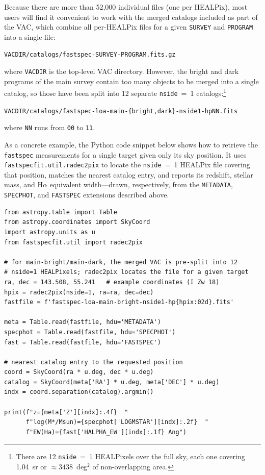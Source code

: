 \documentclass[modern,linenumbers]{aastex702}
\newcommand{\fastspec}{\texttt{fastspec}}
\newcommand{\ha}{\ensuremath{\mathrm{H}\alpha}}
\begin{document}
Because there are more than 52,000 individual files (one per HEALPix),
most users will find it convenient to work with the merged catalogs
included as part of the VAC, which combine all per-HEALPix files for a
given \texttt{SURVEY} and \texttt{PROGRAM} into a single file:

\medskip
\noindent\texttt{VACDIR/catalogs/fastspec-SURVEY-PROGRAM.fits.gz}
\medskip

\noindent where \texttt{VACDIR} is the top-level VAC
directory. However, the bright and dark programs of the main survey
contain too many objects to be merged into a single catalog, so those
have been split into 12 separate \texttt{nside}~=~1
catalogs:\footnote{There are 12 \texttt{nside}~=~1 HEALPixels over the
full sky, each one covering 1.04~sr or $\approx3438$~deg$^{2}$ of
non-overlapping area.}

\medskip
\noindent\texttt{VACDIR/catalogs/fastspec-loa-main-\{bright,dark\}-nside1-hpNN.fits}
\medskip

\noindent where \texttt{NN} runs from \texttt{00} to \texttt{11}.

As a concrete example, the Python code snippet below shows how to
retrieve the \fastspec{} measurements for a single target given only
its sky position. It uses \texttt{fastspecfit.util.radec2pix} to
locate the \texttt{nside}~=~1 HEALPix file covering that position,
matches the nearest catalog entry, and reports its redshift, stellar
mass, and \ha{} equivalent width---drawn, respectively, from the
\texttt{METADATA}, \texttt{SPECPHOT}, and \texttt{FASTSPEC} extensions
described above.

\begin{verbatim}
from astropy.table import Table
from astropy.coordinates import SkyCoord
import astropy.units as u
from fastspecfit.util import radec2pix

# for main-bright/main-dark, the merged VAC is pre-split into 12
# nside=1 HEALPixels; radec2pix locates the file for a given target
ra, dec = 143.508, 55.241   # example coordinates (I Zw 18)
hpix = radec2pix(nside=1, ra=ra, dec=dec)
fastfile = f'fastspec-loa-main-bright-nside1-hp{hpix:02d}.fits'

meta = Table.read(fastfile, hdu='METADATA')
specphot = Table.read(fastfile, hdu='SPECPHOT')
fast = Table.read(fastfile, hdu='FASTSPEC')

# nearest catalog entry to the requested position
coord = SkyCoord(ra * u.deg, dec * u.deg)
catalog = SkyCoord(meta['RA'] * u.deg, meta['DEC'] * u.deg)
indx = coord.separation(catalog).argmin()

print(f"z={meta['Z'][indx]:.4f}  "
      f"log(M*/Msun)={specphot['LOGMSTAR'][indx]:.2f}  "
      f"EW(Ha)={fast['HALPHA_EW'][indx]:.1f} Ang")
\end{verbatim}
\end{document}
